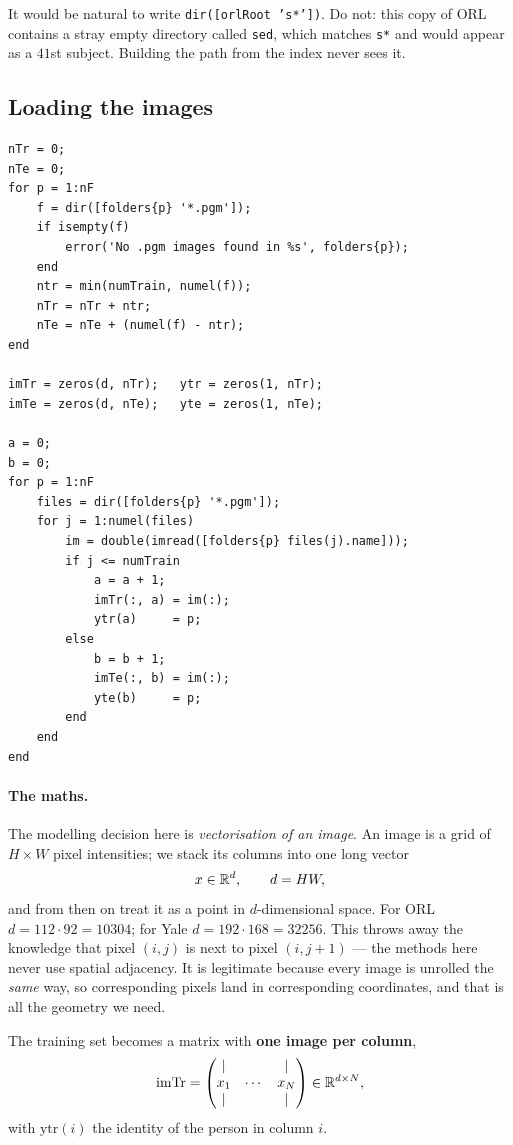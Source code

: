 \begin{gotcha}
It would be natural to write \texttt{dir([orlRoot 's*'])}. Do not: this copy of
ORL contains a stray empty directory called \texttt{sed}, which matches
\texttt{s*} and would appear as a $41$st subject. Building the path from the
index never sees it.
\end{gotcha}

\subsection{Loading the images}
\label{sec:loadfn}

\begin{lstlisting}
nTr = 0;
nTe = 0;
for p = 1:nF
    f = dir([folders{p} '*.pgm']);
    if isempty(f)
        error('No .pgm images found in %s', folders{p});
    end
    ntr = min(numTrain, numel(f));
    nTr = nTr + ntr;
    nTe = nTe + (numel(f) - ntr);
end

imTr = zeros(d, nTr);   ytr = zeros(1, nTr);
imTe = zeros(d, nTe);   yte = zeros(1, nTe);

a = 0;
b = 0;
for p = 1:nF
    files = dir([folders{p} '*.pgm']);
    for j = 1:numel(files)
        im = double(imread([folders{p} files(j).name]));
        if j <= numTrain
            a = a + 1;
            imTr(:, a) = im(:);
            ytr(a)     = p;
        else
            b = b + 1;
            imTe(:, b) = im(:);
            yte(b)     = p;
        end
    end
end
\end{lstlisting}

\paragraph{The maths.} The modelling decision here is \emph{vectorisation of an
image}. An image is a grid of $H \times W$ pixel intensities; we stack its
columns into one long vector
\[
  x \in \mathbb{R}^{d}, \qquad d = HW ,
\]
and from then on treat it as a point in $d$-dimensional space. For ORL
$d = 112\cdot92 = 10304$; for Yale $d = 192\cdot168 = 32256$. This throws away
the knowledge that pixel $(i,j)$ is next to pixel $(i,j{+}1)$ --- the methods
here never use spatial adjacency. It is legitimate because every image is
unrolled the \emph{same} way, so corresponding pixels land in corresponding
coordinates, and that is all the geometry we need.

The training set becomes a matrix with \textbf{one image per column},
\[
  \mathrm{imTr} = \begin{pmatrix} | & & | \\ x_1 & \cdots & x_N \\ | & & | \end{pmatrix}
  \in \mathbb{R}^{d\times N},
\]
with $\mathrm{ytr}(i)$ the identity of the person in column $i$.

